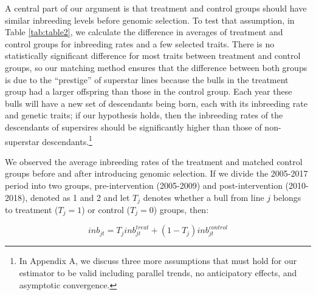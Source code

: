 \documentclass[12pt,letterpaper]{article}
\begin{document}
A central part of our argument is that treatment and control groups should have similar inbreeding levels before genomic selection. To test that assumption, in Table \ref{tab:table2}, we calculate the difference in averages of treatment and control groups for inbreeding rates and a few selected traits. There is no statistically significant difference for most traits between treatment and control groups, so our matching method ensures that the difference between both groups is due to the ``prestige'' of superstar lines because the bulls in the treatment group had a larger offspring than those in the control group. Each year these bulls will have a new set of descendants being born, each with its inbreeding rate and genetic traits; if our hypothesis holds, then the inbreeding rates of the descendants of supersires should be significantly higher than those of non-superstar descendants.\footnote{In Appendix A, we discuss three more assumptions that must hold for our estimator to be valid including parallel trends, no anticipatory effects, and  asymptotic convergence.} 




We observed the average inbreeding rates of the treatment and matched control groups before and after introducing genomic selection. If we divide the 2005-2017 period into two groups, pre-intervention (2005-2009) and post-intervention (2010-2018), denoted as 1 and 2 and let $T_{j}$ denotes whether a bull from line $j$ belongs to treatment ($T_{j}=1$) or control ($T_{j}=0$) groups, then:

\begin{equation*}
    inb_{jt}=T_{j}inb_{jt}^{treat}+(1-T_{j})inb_{jt}^{control}
\end{equation*}
\end{document}
